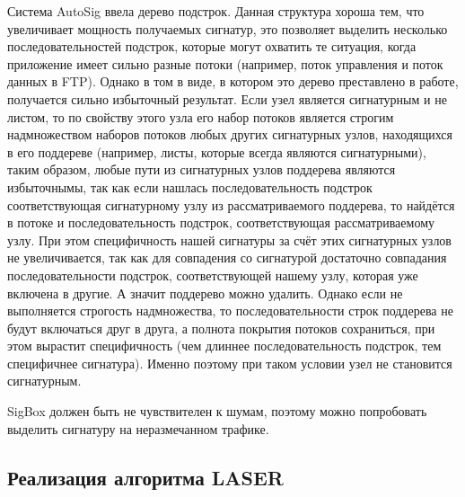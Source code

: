 Система AutoSig ввела дерево подстрок.
Данная структура хороша тем, что увеличивает мощность получаемых сигнатур,
это позволяет выделить несколько последовательностей подстрок, которые могут охватить те ситуация, когда
приложение имеет сильно разные потоки (например, поток управления и поток данных в FTP).
Однако в том в виде, в котором это дерево преставлено в работе, получается сильно избыточный результат.
Если узел является сигнатурным и не листом, то по свойству этого узла его набор потоков является строгим надмножеством
наборов потоков любых других сигнатурных узлов, находящихся в его поддереве (например, листы, которые всегда являются сигнатурными),
таким образом, любые пути из сигнатурных узлов поддерева являются избыточнымы, так как если нашлась последовательность подстрок
соответствующая сигнатурному узлу из рассматриваемого поддерева, то найдётся в потоке и последовательность подстрок, соответствующая рассматриваемому узлу.
При этом специфичность нашей сигнатуры за счёт этих сигнатурных узлов не увеличивается,
так как для совпадения со сигнатурой достаточно совпадания последовательности подстрок, соответствующей нашему узлу, которая уже включена в другие.
А значит поддерево можно удалить. Однако если не выполняется строгость надмножества, то последовательности строк
поддерева не будут включаться друг в друга, а полнота покрытия потоков сохраниться,
при этом вырастит специфичность (чем длиннее последовательность подстрок, тем специфичнее сигнатура).
Именно поэтому при таком условии узел не становится сигнатурным.

SigBox должен быть не чувствителен к шумам, поэтому можно попробовать выделить сигнатуру на неразмечанном трафике.

\subsection{Реализация алгоритма LASER}



\newpage
